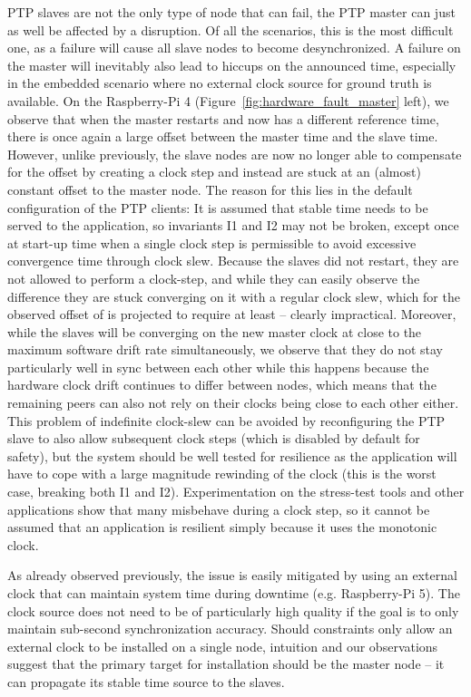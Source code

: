 PTP slaves are not the only type of node that can fail, the PTP master can just as well be affected by a disruption. Of all the scenarios, this is the most difficult one, as a failure will cause all slave nodes to become desynchronized. A failure on the master will inevitably also lead to hiccups on the announced time, especially in the embedded scenario where no external clock source for ground truth is available. On the Raspberry-Pi 4 (Figure~\ref{fig:hardware_fault_master} left), we observe that when the master restarts and now has a different reference time, there is once again a large offset between the master time and the slave time. However, unlike previously, the slave nodes are now no longer able to compensate for the offset by creating a clock step and instead are stuck at an (almost) constant offset to the master node. The reason for this lies in the default configuration of the PTP clients: It is assumed that stable time needs to be served to the application, so invariants I1 and I2 may not be broken, except once at start-up time when a single clock step is permissible to avoid excessive convergence time through clock slew. Because the slaves did not restart, they are not allowed to perform a clock-step, and while they can easily observe the difference they are stuck converging on it with a regular clock slew, which for the observed offset of \fTimeMin{\maxPiFour} is projected to require at least \fTimeMin[-3]{\maxPiFour/\maxClockSlew} -- clearly impractical. Moreover, while the slaves will be converging on the new master clock at close to the maximum software drift rate simultaneously, we observe that they do not stay particularly well in sync between each other while this happens because the hardware clock drift continues to differ between nodes, which means that the remaining peers can also not rely on their clocks being close to each other either. This problem of indefinite clock-slew can be avoided by reconfiguring the PTP slave to also allow subsequent clock steps (which is disabled by default for safety), but the system should be well tested for resilience as the application will have to cope with a large magnitude rewinding of the clock (this is the worst case, breaking both I1 and I2). Experimentation on the stress-test tools and other applications show that many misbehave during a clock step, so it cannot be assumed that an application is resilient simply because it uses the monotonic clock.

As already observed previously, the issue is easily mitigated by using an external clock that can maintain system time during downtime (e.g. Raspberry-Pi 5). The clock source does not need to be of particularly high quality if the goal is to only maintain sub-second synchronization accuracy. Should constraints only allow an external clock to be installed on a single node, intuition and our observations suggest that the primary target for installation should be the master node -- it can propagate its stable time source to the slaves.

